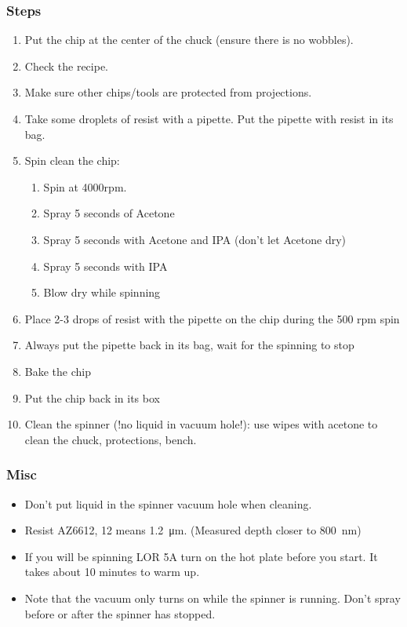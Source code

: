 \documentclass[12pt,a4paper]{report}
\begin{document}
\subsubsection{Steps}
\begin{enumerate}
\item Put the chip at the center of the chuck (ensure there is no wobbles).
\item Check the recipe.
\item Make sure other chips/tools are protected from projections.
\item Take some droplets of resist with a pipette. Put the pipette with resist in its bag.
\item Spin clean the chip:
\begin{enumerate}
\item Spin at 4000rpm.
\item Spray 5 seconds of Acetone
\item Spray 5 seconds with Acetone and IPA (don't let Acetone dry)
\item Spray 5 seconds with IPA
\item Blow dry while spinning
\end{enumerate}
\item Place 2-3 drops of resist with the pipette on the chip during the 500 rpm spin
\item Always put the pipette back in its bag, wait for the spinning to stop
\item Bake the chip
\item Put the chip back in its box
\item Clean the spinner (!no liquid in vacuum hole!): use wipes with acetone to clean the chuck, protections, bench.
\end{enumerate}

\subsubsection{Misc}
\begin{itemize}
\item Don't put liquid in the spinner vacuum hole when cleaning.
\item Resist AZ6612, 12 means \SI{1.2}{\micro\meter}. (Measured depth closer to \SI{800}{\nano\meter})
\item If you will be spinning LOR 5A turn on the hot plate before you start. It takes about 10 minutes to warm up.
\item Note that the vacuum only turns on while the spinner is running. Don't spray before or after the spinner has stopped.
\end{itemize}
\end{document}
